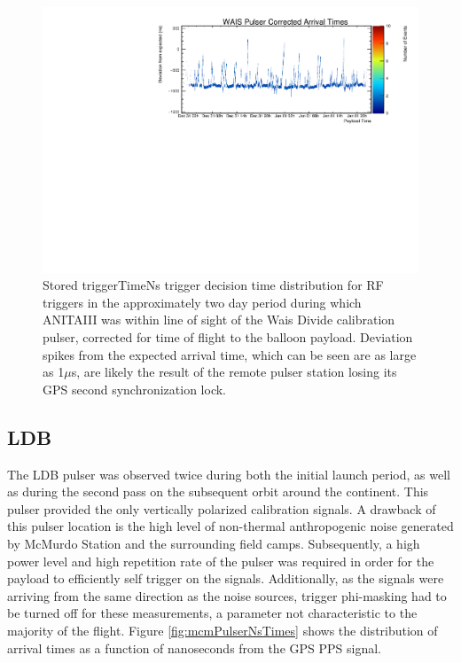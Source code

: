 	\begin{figure}
		\includegraphics[width=\textwidth]{figures/waisPulserCorrNs}
		\caption{Stored triggerTimeNs trigger decision time distribution for RF triggers in the approximately two day period during which ANITAIII was within line of sight of the Wais Divide calibration pulser, corrected for time of flight to the balloon payload.  Deviation spikes from the expected arrival time, which can be seen are as large as 1$\mu$s, are likely the result of the remote pulser station losing its GPS second synchronization lock.}
		\label{fig:waisTrigTimeCorr}
	\end{figure}		
		
		

	\subsection{LDB}
		The LDB pulser was observed twice during both the initial launch period, as well as during the second pass on the subsequent orbit around the continent.  This pulser provided the only vertically polarized calibration signals.  A drawback of this pulser location is the high level of non-thermal anthropogenic noise generated by McMurdo Station and the surrounding field camps.  Subsequently, a high power level and high repetition rate of the pulser was required in order for the payload to efficiently self trigger on the signals.  Additionally, as the signals were arriving from the same direction as the noise sources, trigger phi-masking had to be turned off for these measurements, a parameter not characteristic to the majority of the flight.  Figure \ref{fig:mcmPulserNsTimes} shows the distribution of arrival times as a function of nanoseconds from the GPS PPS signal.
	
